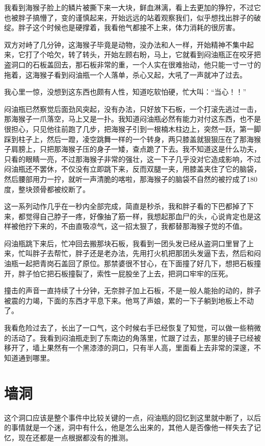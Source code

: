 我看到海猴子脸上的鳞片被撕下来一大块，鲜血淋漓，看上去更加的狰狞，不过它也被胖子搞懵了，变的谨慎起来，开始远远的站着观察我们，似乎想找出胖子的破绽。胖子这个时候也是硬撑着，我看他气都接不上来，体力消耗的很厉害。

双方对峙了几分钟，这海猴子毕竟是动物，没办法和人一样，开始精神不集中起来，它打了个哈欠，转了转头，开始左顾右盼，马上，它就看到闷油瓶正在咬牙把盗洞口的石板盖回去，那石板非常的重，一个人实在很难抬动，他只能一寸一寸的拖着，这海猴子看到闷油瓶一个人落单，杀心又起，大吼了一声就冲了过去。

我心里一惊，没想到这东西也颇有人性，知道吃软怕硬，忙大叫：“当心！！”

闷油瓶已然察觉后面劲风突起，没有办法，只好放下石板，一个打滚先逃过一击，那海猴子一爪落空，马上又是一扑。我知道闷油瓶必然有能力对付这东西，也不是很担心，只见他往前跑了几步，把海猴子引到一根楠木柱边上，突然一跃，第一脚踩到柱子上，然后一蹬，凌空跳舞一样的一个转身，两只膝盖就狠狠压在了那海猴子肩膀上，只把那海猴子压的身子一矮，查点跪了下去。我不知道这是什么功夫，只看的眼睛一亮，不过那海猴子非常的强壮，这一下子几乎没对它造成影响，不过闷油瓶还不罢休，不仅没有立即跳下来，反而双腿一夹，用膝盖夹住了它的脑袋，然后腰部用力一拧，就听一声清脆的喀啦，那海猴子的脑袋不自然的被拧成了180度，整块颈骨都被绞断了。

这一系列动作几乎在一秒内全部完成，简直是秒杀，我和胖子看的下巴都掉了下来，都觉得自己脖子一疼，好像抽了筋一样，我想起那血尸的头，心说肯定也是这样被他拧下来的，不由直吸凉气，这一招太狠了，我都替那海猴子觉的不值。

闷油瓶跳下来后，忙冲回去搬那块石板，我看到一团头发已经从盗洞口里冒了上来，忙叫胖子去帮忙，胖子还是老办法，先用打火机把那团头发逼下去，然后和闷油瓶一起把青岗石盖回了原位。那禁婆很不甘心，在下面撞了好几下，想把石板撞开，胖子怕它把石板撞裂了，索性一屁股坐了上去，把洞口牢牢的压死。

撞击的声音一直持续了十分钟，无奈胖子加上石板，不是一般人能抬的动的，胖子被震的力竭，下面的东西才平息下来。他骂了声娘，累的一下子躺到地板上不动了。

我看危险过去了，长出了一口气，这个时候右手已经恢复了知觉，可以做一些稍微的活动了。我看到闷油瓶走到了东南边的角落里，忙跟了过去，那里的镜子已经被移开了，墙上果然有一个黑漆漆的洞口，只有半人高，里面看上去非常的深邃，不知道通到哪里。

\chapter{墙洞}

这个洞口应该是整个事件中比较关键的一点，闷油瓶的回忆到这里就中断了，以后的事情就是一个迷，洞中有什么，他是怎么出来的，其他人是否像他一样失去了记忆，现在还都是一点根据都没有的推测。

